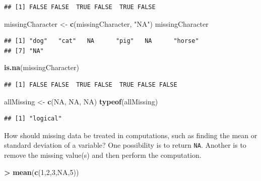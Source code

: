 \documentclass[
]{krantz}
\newenvironment{Shaded}{\begin{snugshade}}{\end{snugshade}}
\newcommand{\DecValTok}[1]{\textcolor[rgb]{0.00,0.00,0.81}{#1}}
\newcommand{\KeywordTok}[1]{\textcolor[rgb]{0.13,0.29,0.53}{\textbf{#1}}}
\newcommand{\NormalTok}[1]{#1}
\newcommand{\OperatorTok}[1]{\textcolor[rgb]{0.81,0.36,0.00}{\textbf{#1}}}
\newcommand{\OtherTok}[1]{\textcolor[rgb]{0.56,0.35,0.01}{#1}}
\newcommand{\StringTok}[1]{\textcolor[rgb]{0.31,0.60,0.02}{#1}}
\begin{document}
\begin{verbatim}
## [1] FALSE FALSE  TRUE FALSE  TRUE FALSE
\end{verbatim}

\begin{Shaded}
\begin{Highlighting}[]
\NormalTok{missingCharacter \textless{}{-}}\StringTok{ }\KeywordTok{c}\NormalTok{(missingCharacter, }\StringTok{"NA"}\NormalTok{)}
\NormalTok{missingCharacter}
\end{Highlighting}
\end{Shaded}

\begin{verbatim}
## [1] "dog"   "cat"   NA      "pig"   NA      "horse"
## [7] "NA"
\end{verbatim}

\begin{Shaded}
\begin{Highlighting}[]
\KeywordTok{is.na}\NormalTok{(missingCharacter)}
\end{Highlighting}
\end{Shaded}

\begin{verbatim}
## [1] FALSE FALSE  TRUE FALSE  TRUE FALSE FALSE
\end{verbatim}

\begin{Shaded}
\begin{Highlighting}[]
\NormalTok{allMissing \textless{}{-}}\StringTok{ }\KeywordTok{c}\NormalTok{(}\OtherTok{NA}\NormalTok{, }\OtherTok{NA}\NormalTok{, }\OtherTok{NA}\NormalTok{)}
\KeywordTok{typeof}\NormalTok{(allMissing)}
\end{Highlighting}
\end{Shaded}

\begin{verbatim}
## [1] "logical"
\end{verbatim}

How should missing data be treated in computations, such as finding the mean or standard deviation of a variable? One possibility is to return \texttt{NA}. Another is to remove the missing value(s) and then perform the computation.

\begin{Shaded}
\begin{Highlighting}[]
\OperatorTok{\textgreater{}}\StringTok{ }\KeywordTok{mean}\NormalTok{(}\KeywordTok{c}\NormalTok{(}\DecValTok{1}\NormalTok{,}\DecValTok{2}\NormalTok{,}\DecValTok{3}\NormalTok{,}\OtherTok{NA}\NormalTok{,}\DecValTok{5}\NormalTok{))}
\end{Highlighting}
\end{Shaded}
\end{document}
